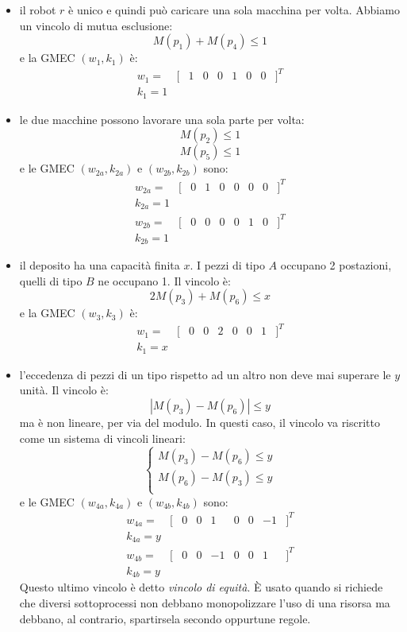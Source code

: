 \documentclass[a4paper]{report}
\begin{document}
\begin{itemize}
\item il robot $r$ \`e unico e quindi pu\`o caricare una sola macchina
  per volta. Abbiamo un vincolo di mutua esclusione:
  \[
  M(p_1) + M(p_4) \leq 1
  \]
  e la GMEC $(w_1, k_1)$ \`e:
  \[
  \begin{array}{ccccccccc}
    w_1 = & [ & 1 & 0 & 0 & 1 & 0 & 0 & ]^T\\
    k_1 = 1
  \end{array}
  \]
\item le due macchine possono lavorare una sola parte per volta:
  \[
  M(p_2) \leq 1
  \]
  \[
  M(p_5) \leq 1
  \]
  e le GMEC $(w_{2a}, k_{2a})$ e $(w_{2b}, k_{2b})$ sono:
  \[
  \begin{array}{ccccccccc}
    w_{2a} = & [ & 0 & 1 & 0 & 0 & 0 & 0 & ]^T\\
    k_{2a} = 1\\
    w_{2b} = & [ & 0 & 0 & 0 & 0 & 1 & 0 & ]^T\\
    k_{2b} = 1
  \end{array}
  \]
\item il deposito ha una capacit\`a finita $x$. I pezzi di tipo $A$
  occupano 2 postazioni, quelli di tipo $B$ ne occupano 1. Il vincolo
  \`e:
  \[
  2M(p_3) + M(p_6) \leq x
  \]
  e la GMEC $(w_3, k_3)$ \`e:
  \[
  \begin{array}{ccccccccc}
    w_1 = & [ & 0 & 0 & 2 & 0 & 0 & 1 & ]^T\\
    k_1 = x
  \end{array}
  \]
\item l'eccedenza di pezzi di un tipo rispetto ad un altro non deve
  mai superare le $y$ unit\`a. Il vincolo \`e:
  \[
  |M(p_3) - M(p_6)| \leq y
  \]
  ma \`e non lineare, per via del modulo. In questi caso, il vincolo
  va riscritto come un sistema di vincoli lineari:
  \[
  \left \{
  \begin{array}{l}
  M(p_3) - M(p_6) \leq y\\
  M(p_6) - M(p_3) \leq y\\
  \end{array}
  \right .
  \]
  e le GMEC $(w_{4a}, k_{4a})$ e $(w_{4b}, k_{4b})$ sono:
  \[
  \begin{array}{ccccccccc}
    w_{4a} = & [ & 0 & 0 & 1 & 0 & 0 & -1 & ]^T\\
    k_{4a} = y\\
    w_{4b} = & [ & 0 & 0 & -1 & 0 & 0 & 1 & ]^T\\
    k_{4b} = y
  \end{array}
  \]
  Questo ultimo vincolo \`e detto {\em vincolo di
    equit\`a}. \`E usato
  quando si richiede che diversi sottoprocessi non debbano
  monopolizzare l'uso di una risorsa ma debbano, al contrario,
  spartirsela secondo oppurtune regole.
\end{itemize}
\end{document}
